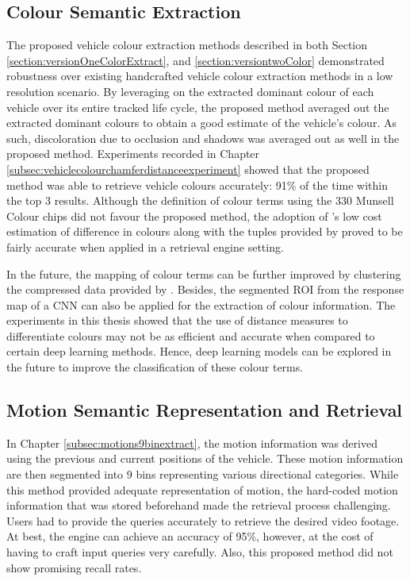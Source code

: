 \subsection*{Colour Semantic Extraction}
The proposed vehicle colour extraction methods described in both Section \ref{section:versionOneColorExtract}, and \ref{section:versiontwoColor} demonstrated robustness over existing handcrafted vehicle colour extraction methods in a low resolution scenario. By leveraging on the extracted dominant colour of each vehicle over its entire tracked life cycle, the proposed method averaged out the extracted dominant colours to obtain a good estimate of the vehicle's colour. As such, discoloration due to occlusion and shadows was averaged out as well in the proposed method. Experiments recorded in Chapter \ref{subsec:vehiclecolourchamferdistanceexperiment} showed that the proposed method was able to retrieve vehicle colours accurately: 91\% of the time within the top 3 results.   %
Although the definition of colour terms using the 330 Munsell Colour chips did not favour the proposed method, the adoption of \cite{riemersma}'s low cost estimation of difference in colours %
along with the tuples provided by \cite{munroe2010color} proved to be fairly accurate when applied in a retrieval engine setting.     

In the future, the mapping of colour terms can be further improved by clustering the compressed data provided by . Besides, the segmented ROI from the response map of a CNN can also be applied for the extraction of colour information. The experiments in this thesis showed that the use of distance measures to differentiate colours may not be as efficient and accurate when compared to certain deep learning methods. Hence, deep learning models can be explored in the future to improve the classification of these colour terms.

\subsection*{Motion Semantic Representation and Retrieval}
In Chapter \ref{subsec:motions9binextract}, the motion information was derived using the previous and current positions of the vehicle. These motion information are then segmented into 9 bins representing various directional categories. While this method provided adequate representation of motion, the hard-coded motion information that was stored beforehand made the retrieval process challenging. Users had to provide the queries accurately to retrieve the desired video footage. At best, the \versionOneRet engine can achieve an accuracy of 95\%, however, at the cost of having to craft input queries very carefully. Also, this proposed method did not show promising recall rates. 

